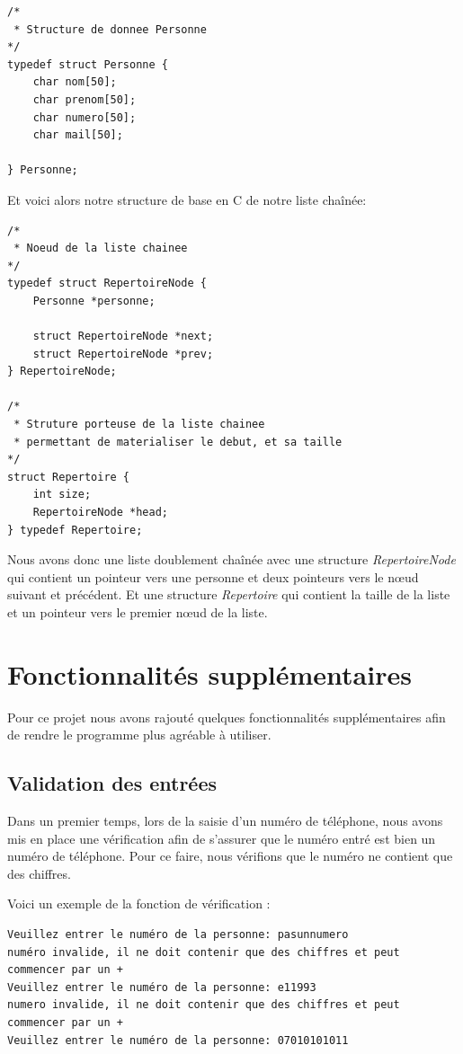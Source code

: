 \documentclass[12pt]{report}
\begin{document}
\begin{verbatim}
/*
 * Structure de donnee Personne
*/
typedef struct Personne {
    char nom[50];
    char prenom[50];
    char numero[50];
    char mail[50];

} Personne;
\end{verbatim}


Et voici alors notre structure de base en C de notre liste chaînée:
\begin{verbatim}
/*
 * Noeud de la liste chainee
*/
typedef struct RepertoireNode {
    Personne *personne;

    struct RepertoireNode *next;
    struct RepertoireNode *prev;
} RepertoireNode;

/*
 * Struture porteuse de la liste chainee
 * permettant de materialiser le debut, et sa taille
*/
struct Repertoire {
    int size;
    RepertoireNode *head;
} typedef Repertoire;
\end{verbatim}

Nous avons donc une liste doublement chaînée avec une structure \textit{RepertoireNode} qui contient un pointeur vers une personne et deux pointeurs vers le nœud suivant et précédent. Et une structure \textit{Repertoire} qui contient la taille de la liste et un pointeur vers le premier nœud de la liste.

\chapter{Fonctionnalités supplémentaires}
Pour ce projet nous avons rajouté quelques fonctionnalités supplémentaires afin de rendre le programme plus agréable à utiliser.
\section{Validation des entrées}
Dans un premier temps, lors de la saisie d’un numéro de téléphone, nous avons mis en place une vérification afin de s’assurer que le numéro entré est bien un numéro de téléphone. Pour ce faire, nous vérifions que le numéro ne contient que des chiffres.

Voici un exemple de la fonction de vérification :
\begin{verbatim}
Veuillez entrer le numéro de la personne: pasunnumero
numéro invalide, il ne doit contenir que des chiffres et peut commencer par un +
Veuillez entrer le numéro de la personne: e11993
numero invalide, il ne doit contenir que des chiffres et peut commencer par un +
Veuillez entrer le numéro de la personne: 07010101011
\end{verbatim}
\end{document}
